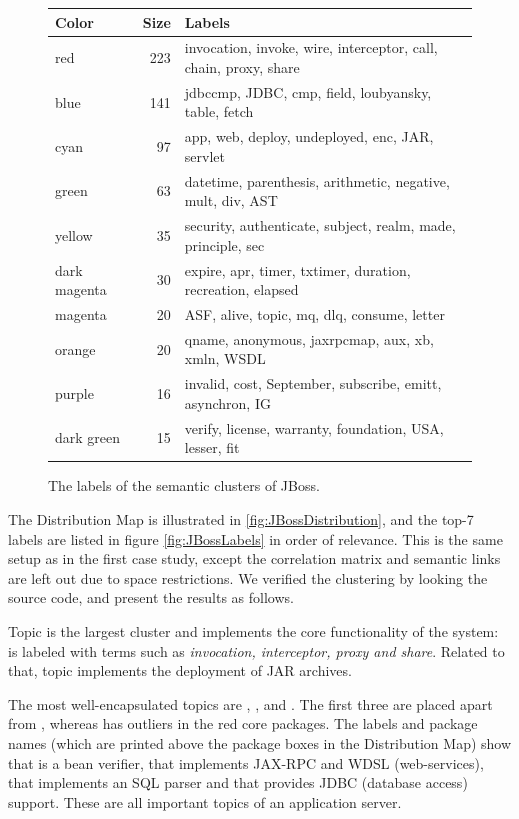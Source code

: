 \documentclass[10pt]{book}
\begin{document}
\begin{figure}[h]
  \centering
  \begin{scriptsize}
  \begin{tabular}{l|rl}
    \hline
    \textbf{Color} & \textbf{Size} & \textbf{Labels}\\
    \hline
    red & 223 & invocation, invoke, wire, interceptor, call, chain, proxy, share\\
    blue & 141 & jdbccmp, JDBC, cmp, field, loubyansky, table, fetch\\
    cyan & 97 & app, web, deploy, undeployed, enc, JAR, servlet\\
    green & 63 & datetime, parenthesis, arithmetic, negative, mult, div, AST\\
    yellow & 35 & security, authenticate, subject, realm, made, principle, sec\\
    dark magenta & 30 & expire, apr, timer, txtimer, duration, recreation, elapsed\\
    magenta & 20 & ASF, alive, topic, mq, dlq, consume, letter\\
    orange & 20 & qname, anonymous, jaxrpcmap, aux, xb, xmln, WSDL\\
    purple & 16 & invalid, cost, September, subscribe, emitt, asynchron, IG\\
    dark green & 15 & verify, license, warranty, foundation, USA, lesser, fit\\
    \hline
  \end{tabular}
  \end{scriptsize}
  \caption{The labels of the semantic clusters of JBoss.}\label{fig:JBossLabels}
\end{figure}


The Distribution Map is illustrated in \autoref{fig:JBossDistribution}, and the top-7 labels are listed in figure \autoref{fig:JBossLabels} in order of relevance. This is the same setup as in the first case study, except the correlation matrix and semantic links are left out due to space restrictions. We verified the clustering by looking the source code, and present the results as follows.

Topic \red is the largest cluster and implements the core functionality of the system: is labeled with terms such as \emph{invocation, interceptor, proxy \emph{and} share}. Related to that, topic \cyan implements the deployment of JAR archives.

The most well-encapsulated topics are \darkgreen, \orange, \green and \blue. The first three are placed apart from \red, whereas \blue has outliers in the red core packages. The labels and package names (which are printed above the package boxes in the Distribution Map) show that \darkgreen is a bean verifier, that \orange implements JAX-RPC and WDSL (\eg web-services), that \green implements an SQL parser and that \blue provides JDBC (\eg database access) support. These are all important topics of an application server.
\end{document}
